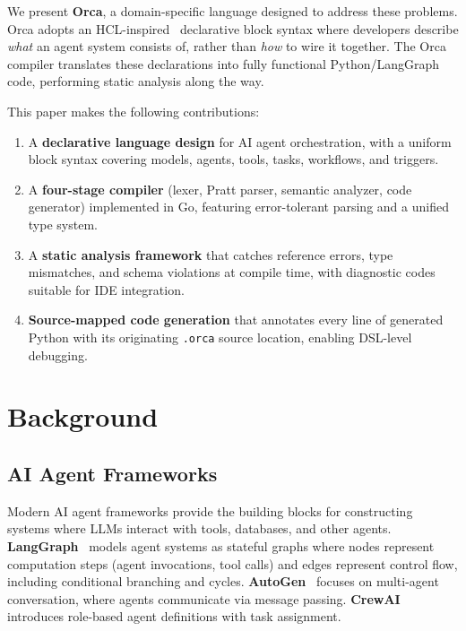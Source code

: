 \documentclass[sigconf,nonacm]{acmart}
\begin{document}
We present \textbf{Orca}, a domain-specific language designed to address
these problems. Orca adopts an HCL-inspired~\cite{terraform} declarative
block syntax where developers describe \emph{what} an agent system consists
of, rather than \emph{how} to wire it together. The Orca compiler translates
these declarations into fully functional Python/LangGraph code, performing
static analysis along the way.

This paper makes the following contributions:
\begin{enumerate}[leftmargin=*]
  \item A \textbf{declarative language design} for AI agent orchestration,
        with a uniform block syntax covering models, agents, tools, tasks,
        workflows, and triggers.
  \item A \textbf{four-stage compiler} (lexer, Pratt parser, semantic
        analyzer, code generator) implemented in Go, featuring error-tolerant
        parsing and a unified type system.
  \item A \textbf{static analysis framework} that catches reference errors,
        type mismatches, and schema violations at compile time, with
        diagnostic codes suitable for IDE integration.
  \item \textbf{Source-mapped code generation} that annotates every line of
        generated Python with its originating \texttt{.orca} source location,
        enabling DSL-level debugging.
\end{enumerate}

\section{Background}
\label{sec:background}

\subsection{AI Agent Frameworks}
\label{sec:background:frameworks}

Modern AI agent frameworks provide the building blocks for constructing
systems where LLMs interact with tools, databases, and other agents.
\textbf{LangGraph}~\cite{langgraph} models agent systems as stateful graphs
where nodes represent computation steps (agent invocations, tool calls) and
edges represent control flow, including conditional branching and cycles.
\textbf{AutoGen}~\cite{autogen} focuses on multi-agent conversation, where
agents communicate via message passing. \textbf{CrewAI}~\cite{crewai}
introduces role-based agent definitions with task assignment.
\end{document}
